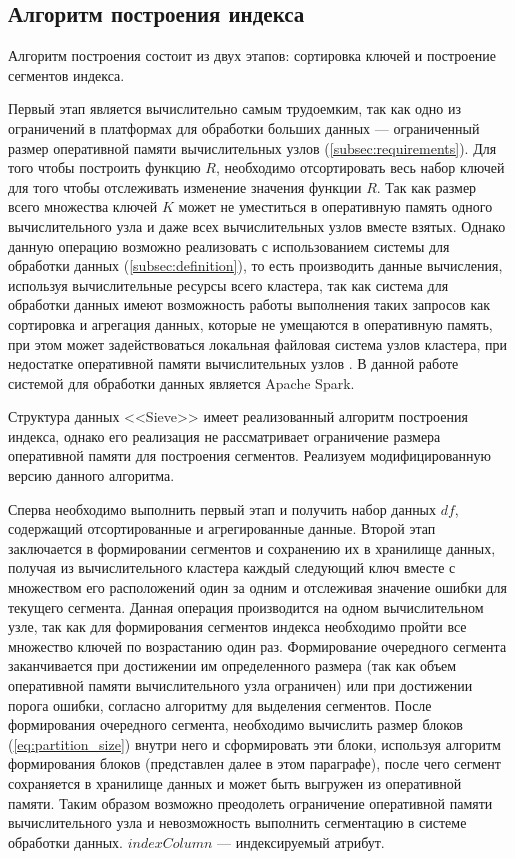 \subsection{Алгоритм построения индекса}\label{build}

Алгоритм построения состоит из двух этапов: сортировка ключей и построение сегментов индекса.

Первый этап является вычислительно самым трудоемким, так как одно из ограничений в платформах для обработки больших данных --- ограниченный размер оперативной памяти вычислительных узлов (\ref{subsec:requirements}). Для того чтобы построить функцию $R$, необходимо отсортировать весь набор ключей для того чтобы отслеживать изменение значения функции $R$. Так как размер всего множества ключей $K$ может не уместиться в оперативную память одного вычислительного узла и даже всех вычислительных узлов вместе взятых. Однако данную операцию возможно реализовать с использованием системы для обработки данных (\ref{subsec:definition}), то есть производить данные вычисления, используя вычислительные ресурсы всего кластера, так как система для обработки данных имеют возможность работы выполнения таких запросов как сортировка и агрегация данных, которые не умещаются в оперативную память, при этом может задействоваться локальная файловая система узлов кластера, при недостатке оперативной памяти вычислительных узлов \cite{Impact_of_memory_size_on_bigdata}. В данной работе системой для обработки данных является Apache Spark.

Структура данных {<<Sieve>>} имеет реализованный алгоритм построения индекса, однако его реализация не рассматривает ограничение размера оперативной памяти для построения сегментов. Реализуем модифицированную версию данного алгоритма.

Сперва необходимо выполнить первый этап и получить набор данных $df$, содержащий отсортированные и агрегированные данные. Второй этап заключается в формировании сегментов и сохранению их в хранилище данных, получая из вычислительного кластера каждый следующий ключ вместе с множеством его расположений один за одним и отслеживая значение ошибки для текущего сегмента. Данная операция производится на одном вычислительном узле, так как для формирования сегментов индекса необходимо пройти все множество ключей по возрастанию один раз. Формирование очередного сегмента заканчивается при достижении им определенного размера (так как объем оперативной памяти вычислительного узла ограничен) или при достижении порога ошибки, согласно алгоритму для выделения сегментов. После формирования очередного сегмента, необходимо вычислить размер блоков (\ref{eq:partition_size}) внутри него и сформировать эти блоки, используя алгоритм формирования блоков (представлен далее в этом параграфе), после чего сегмент сохраняется в хранилище данных и может быть выгружен из оперативной памяти. Таким образом возможно преодолеть ограничение оперативной памяти вычислительного узла и невозможность выполнить сегментацию в системе обработки данных. $indexColumn$ --- индексируемый атрибут.

